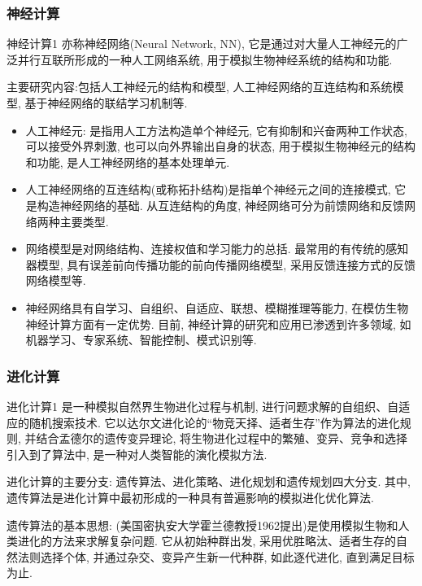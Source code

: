 \subsubsection{神经计算}
\begin{mydef}{神经计算}{1}
亦称神经网络(Neural Network, NN), 它是通过对大量人工神经元的广泛并行互联所形成的一种人工网络系统, 用于模拟生物神经系统的结构和功能.
\end{mydef}
主要研究内容:包括人工神经元的结构和模型, 人工神经网络的互连结构和系统模型, 基于神经网络的联结学习机制等.
\begin{itemize}
\item 人工神经元: 是指用人工方法构造单个神经元, 它有抑制和兴奋两种工作状态, 可以接受外界刺激, 也可以向外界输出自身的状态, 用于模拟生物神经元的结构和功能, 是人工神经网络的基本处理单元.
\item 人工神经网络的互连结构(或称拓扑结构)是指单个神经元之间的连接模式, 它是构造神经网络的基础. 从互连结构的角度, 神经网络可分为前馈网络和反馈网络两种主要类型.
\item 网络模型是对网络结构、连接权值和学习能力的总括. 最常用的有传统的感知器模型, 具有误差前向传播功能的前向传播网络模型, 采用反馈连接方式的反馈网络模型等.
\item 神经网络具有自学习、自组织、自适应、联想、模糊推理等能力, 在模仿生物神经计算方面有一定优势. 目前, 神经计算的研究和应用已渗透到许多领域, 如机器学习、专家系统、智能控制、模式识别等.
\end{itemize}
\subsubsection{进化计算}
\begin{mydef}{进化计算}{1}
是一种模拟自然界生物进化过程与机制, 进行问题求解的自组织、自适应的随机搜索技术. 它以达尔文进化论的“物竞天择、适者生存”作为算法的进化规则, 并结合孟德尔的遗传变异理论, 将生物进化过程中的繁殖、变异、竞争和选择引入到了算法中, 是一种对人类智能的演化模拟方法.
\end{mydef}

进化计算的主要分支: 遗传算法、进化策略、进化规划和遗传规划四大分支. 其中, 遗传算法是进化计算中最初形成的一种具有普遍影响的模拟进化优化算法.

遗传算法的基本思想: (美国密执安大学霍兰德教授1962提出)是使用模拟生物和人类进化的方法来求解复杂问题. 它从初始种群出发, 采用优胜略汰、适者生存的自然法则选择个体, 并通过杂交、变异产生新一代种群, 如此逐代进化, 直到满足目标为止.
